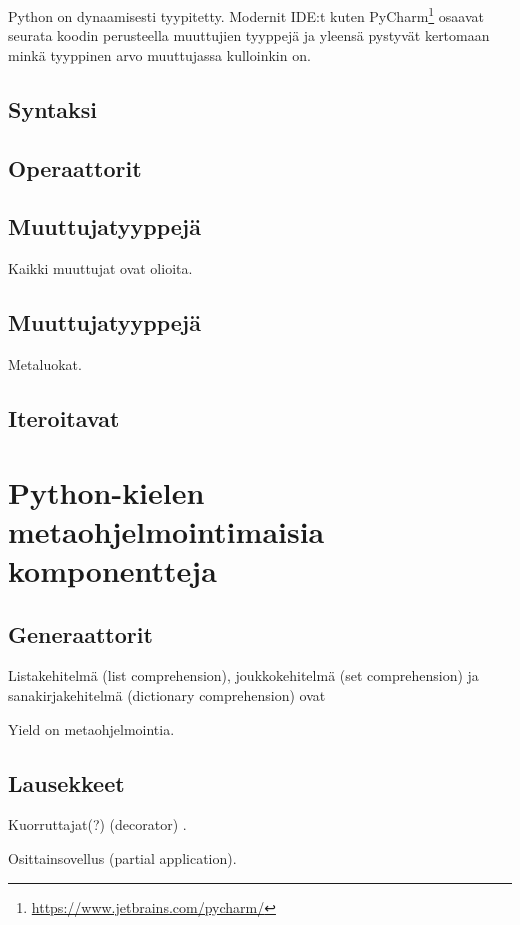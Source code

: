 \documentclass[finnish]{tktltiki2}
\theoremstyle{definition}
\theoremstyle{remark}
\begin{document}
Python on dynaamisesti tyypitetty. Modernit IDE:t kuten PyCharm\footnote{\url{https://www.jetbrains.com/pycharm/}} osaavat seurata koodin perusteella muuttujien tyyppejä ja yleensä pystyvät kertomaan minkä tyyppinen arvo muuttujassa kulloinkin on.

\subsection{Syntaksi}

\subsection{Operaattorit}

\subsection{Muuttujatyyppejä}

Kaikki muuttujat ovat olioita.


\subsection{Muuttujatyyppejä}

Metaluokat.


\subsection{Iteroitavat}

\section{Python-kielen metaohjelmointimaisia komponentteja}

\subsection{Generaattorit}

Listakehitelmä (list comprehension), joukkokehitelmä (set comprehension) ja sanakirjakehitelmä (dictionary comprehension) ovat

Yield on metaohjelmointia.

\subsection{Lausekkeet}

Kuorruttajat(?) (decorator) \cite{dubois2005nest}.

Osittainsovellus (partial application).
\end{document}
